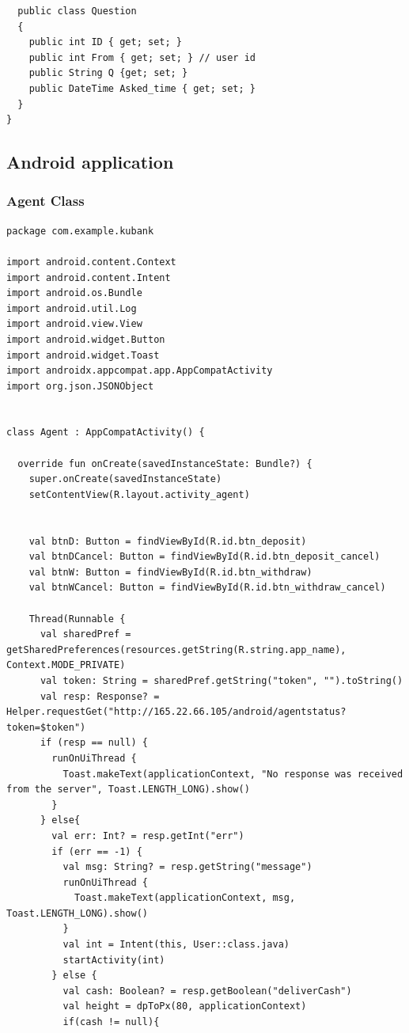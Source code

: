 \documentclass[11pt, a4paper]{article}
\begin{document}
\begin{appendices}
\begin{lstlisting}
  public class Question
  {
    public int ID { get; set; }
    public int From { get; set; } // user id
    public String Q {get; set; }
    public DateTime Asked_time { get; set; }
  }
}
\end{lstlisting}
\subsection{Android application} %
\subsubsection{Agent Class}
\begin{lstlisting}
package com.example.kubank

import android.content.Context
import android.content.Intent
import android.os.Bundle
import android.util.Log
import android.view.View
import android.widget.Button
import android.widget.Toast
import androidx.appcompat.app.AppCompatActivity
import org.json.JSONObject


class Agent : AppCompatActivity() {

  override fun onCreate(savedInstanceState: Bundle?) {
    super.onCreate(savedInstanceState)
    setContentView(R.layout.activity_agent)


    val btnD: Button = findViewById(R.id.btn_deposit)
    val btnDCancel: Button = findViewById(R.id.btn_deposit_cancel)
    val btnW: Button = findViewById(R.id.btn_withdraw)
    val btnWCancel: Button = findViewById(R.id.btn_withdraw_cancel)

    Thread(Runnable {
      val sharedPref = getSharedPreferences(resources.getString(R.string.app_name), Context.MODE_PRIVATE)
      val token: String = sharedPref.getString("token", "").toString()
      val resp: Response? = Helper.requestGet("http://165.22.66.105/android/agentstatus?token=$token")
      if (resp == null) {
        runOnUiThread {
          Toast.makeText(applicationContext, "No response was received from the server", Toast.LENGTH_LONG).show()
        }
      } else{
        val err: Int? = resp.getInt("err")
        if (err == -1) {
          val msg: String? = resp.getString("message")
          runOnUiThread {
            Toast.makeText(applicationContext, msg, Toast.LENGTH_LONG).show()
          }
          val int = Intent(this, User::class.java)
          startActivity(int)
        } else {
          val cash: Boolean? = resp.getBoolean("deliverCash")
          val height = dpToPx(80, applicationContext)
          if(cash != null){


\end{lstlisting}
\end{appendices}
\end{document}
